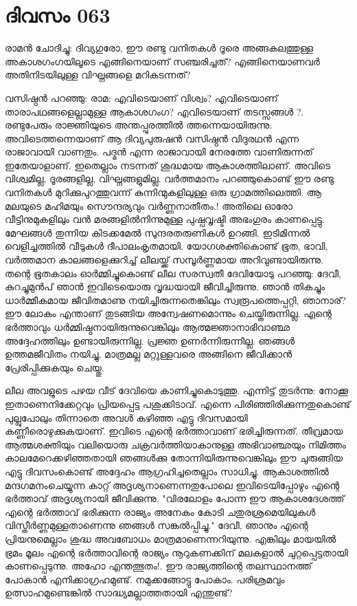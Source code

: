 \newpage
\section{ദിവസം 063}


രാമന്‍ ചോദിച്ചു: ദിവ്യഗുരോ, ഈ രണ്ടു വനിതകള്‍ ദൂരെ അങ്ങകലത്തുള്ള അകാശഗംഗയിലൂടെ എങ്ങിനെയാണ്‌ സഞ്ചരിച്ചത്‌? എങ്ങിനെയാണവര്‍ അതിനിടയിലുള്ള വിഘ്നങ്ങളെ മറികടന്നത്‌?

വസിഷ്ഠന്‍ പറഞ്ഞു: രാമ: എവിടെയാണ്‌ വിശ്വം? എവിടെയാണ്‌ താരാപഥങ്ങളെല്ലാമുള്ള ആകാശഗംഗ? എവിടെയാണ്‌ തടസ്സങ്ങള്‍ ?. രണ്ടുപേരും രാജ്ഞിയുടെ അന്തപ്പുരത്തില്‍ ത്തന്നെയായിരുന്നു. അവിടെത്തന്നെയാണ്‌ ആ ദിവ്യപുരുഷന്‍ വസിഷ്ഠന്‍ വിദുരഥന്‍ എന്ന രാജാവായി വാണതും. പദ്മന്‍ എന്ന രാജാവായി നേരത്തേ വാണിരുന്നത്‌ ഇതേയാളാണ്‌. ഇതെല്ലാം നടന്നത്‌ ശുദ്ധമായ ആകാശത്തിലാണ്‌. അവിടെ വിശ്വമില്ല, ദൂരങ്ങളില്ല, വിഘ്നങ്ങളുമില്ല. വര്‍ത്തമാനം പറഞ്ഞുകൊണ്ട്‌ ഈ രണ്ടു വനിതകള്‍ മുറിക്കുപുറത്തുവന്ന് കുന്നിന്മുകളിലുള്ള ഒരു ഗ്രാമത്തിലെത്തി. ആ മലയുടെ മഹിമയും സൌന്ദര്യവും വര്‍ണ്ണനാതീതം.! അതിലെ ഓരോ വീട്ടിനുമുകളിലും വന്‍ മരങ്ങളില്‍നിന്നുമുള്ള പുഷ്പവൃഷ്ടി അഭംഗുരം കാണപ്പെട്ടു. മേഘങ്ങള്‍ തുന്നിയ കിടക്കമേല്‍ സുന്ദരതരുണികള്‍ ഉറങ്ങി. ഇടിമിന്നല്‍ വെളിച്ചത്തില്‍ വീടുകള്‍ ദീപാലംകൃതമായി. യോഗശക്തികൊണ്ട്‌ ഭൂത, ഭാവി, വര്‍ത്തമാന കാലങ്ങളെക്കുറിച്ച്‌ ലീലയ്ക്ക്‌ സമ്പൂര്‍ണ്ണമായ അറിവുണ്ടായിരുന്നു. തന്റെ ഭൂതകാലം ഓര്‍മ്മിച്ചുകൊണ്ട്‌ ലീല സരസ്വതീ ദേവിയോടു പറഞ്ഞു: ദേവീ, കുറച്ചുമുന്‍പ്‌ ഞാന്‍ ഇവിടെയൊരു വൃദ്ധയായി ജീവിച്ചിരുന്നു. ഞാന്‍ തികച്ചും ധാര്‍മ്മീകമായ ജീവിതമാണു നയിച്ചിരുന്നതെങ്കിലും സ്വരൂപത്തെപ്പറ്റി, ഞാനാര്‌? ഈ ലോകം എന്താണ്‌ തുടങ്ങിയ അന്വേഷണമൊന്നും ചെയ്തിരുന്നില്ല. എന്റെ ഭര്‍ത്താവും ധര്‍മ്മിഷ്ഠനായിരുന്നുവെങ്കിലും ആത്മജ്ഞാനാഭിവാഞ്ഛ അദ്ദേഹത്തിലും ഉണ്ടായിരുന്നില്ല. പ്രജ്ഞ ഉണര്‍ന്നിരുന്നില്ല. ഞങ്ങള്‍ ഉത്തമജീവിതം നയിച്ചു, മാത്രമല്ല മറ്റുള്ളവരെ അങ്ങിനെ ജീവിക്കാന്‍ പ്രേരിപ്പിക്കുകയും ചെയ്തു. 

ലീല അവളുടെ പഴയ വീട്‌ ദേവിയെ കാണിച്ചുകൊടുത്തു. എന്നിട്ട്‌ തുടര്‍ന്നു: നോക്കൂ ഇതാണെനിക്കേറ്റവും പ്രിയപ്പെട്ട പശുക്കിടാവ്‌. എന്നെ പിരിഞ്ഞിരിക്കുന്നതുകൊണ്ട്‌ പുല്ലുപോലും തിന്നാതെ അവള്‍ കഴിഞ്ഞ എട്ടു ദിവസമായി കണ്ണീരൊഴുക്കുകയാണ്‌. ഇവിടെ എന്റെ ഭര്‍ത്താവാണ്‌ ഭരിച്ചിരുന്നത്‌. തീവ്രമായ ആത്മശക്തിയും വലിയൊരു ചക്രവര്‍ത്തിയാകാനുള്ള അഭിവാഞ്ഛയും നിമിത്തം കാലമേറെക്കഴിഞ്ഞതായി ഞങ്ങള്‍ക്കു തോന്നിയിരുന്നുവെങ്കിലും ഈ ചുരുങ്ങിയ എട്ടു ദിവസംകൊണ്ട്‌ അദ്ദേഹം ആഗ്രഹിച്ചതെല്ലാം സാധിച്ചു. ആകാശത്തില്‍ മന്ദഗമനംചെയ്യുന്ന കാറ്റ്‌ അദൃശ്യനാണെന്നതുപോലെ ഇവിടെയിപ്പോഴും എന്റെ ഭര്‍ത്താവ്‌ അദൃശ്യനായി ജീവിക്കുന്നു. "വിരലോളം പോന്ന ഈ ആകാശദേശത്ത്‌ എന്റെ ഭര്‍ത്താവ്‌ ഭരിക്കുന്ന രാജ്യം അനേകം കോടി ചതുരശ്രമെയിലുകള്‍ വിസ്തീര്‍ണ്ണമുള്ളതാണെന്നു ഞങ്ങള്‍ സങ്കല്‍പ്പിച്ചു." ദേവീ, ഞാനും എന്റെ പ്രിയനുമെല്ലാം ശുദ്ധ അവബോധം മാത്രമാണെന്നറിയുന്നു. എങ്കിലും മായയില്‍ ഭ്രമം മൂലം എന്റെ ഭര്‍ത്താവിന്റെ രാജ്യം നൂറുകണക്കിന്‌ മലകളാല്‍ ചുറ്റപ്പെട്ടതായി കാണപ്പെടുന്നു. അഹോ എന്തത്ഭുതം!. ഈ രാജ്യത്തിന്റെ തലസ്ഥാനത്ത്‌ പോകാന്‍ എനിക്കാഗ്രഹമുണ്ട്‌. നമുക്കങ്ങോട്ടു പോകാം. പരിശ്രമവും ഉത്സാഹമുണ്ടെങ്കില്‍ സാദ്ധ്യമല്ലാത്തതായി എന്തുണ്ട്‌?
